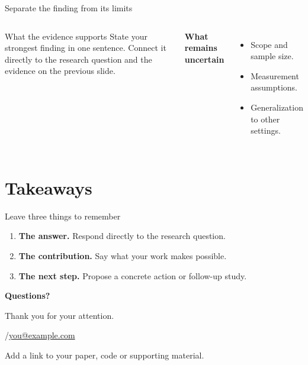 \documentclass[aspectratio=169,11pt]{beamer}
\begin{document}
\begin{frame}{Separate the finding from its limits}
\begin{columns}[T,onlytextwidth]
\begin{block}{What the evidence supports}
State your strongest finding in one sentence. Connect it directly to the
research question and the evidence on the previous slide.
\end{block}
\textbf{What remains uncertain}\par\vspace{3mm}
\begin{itemize}\setlength{\itemsep}{3mm}
\item Scope and sample size.
\item Measurement assumptions.
\item Generalization to other settings.
\end{itemize}
\end{columns}
\end{frame}

\section{Takeaways}
\begin{frame}{Leave three things to remember}
\begin{enumerate}\setlength{\itemsep}{6mm}
\item \textbf{The answer.} Respond directly to the research question.
\item \textbf{The contribution.} Say what your work makes possible.
\item \textbf{The next step.} Propose a concrete action or follow-up study.
\end{enumerate}
\end{frame}

\begin{frame}[plain]
\vfill
{\Huge\bfseries Questions?}\par\vspace{5mm}
{\large\color{accent}Thank you for your attention.}\par
{}\vspace{5mm}
\insertauthor\quad /\quad\href{mailto:you@example.com}{you@example.com}\par
{\small\color{muted}Add a link to your paper, code or supporting material.}
\vfill
\end{frame}
\end{document}
